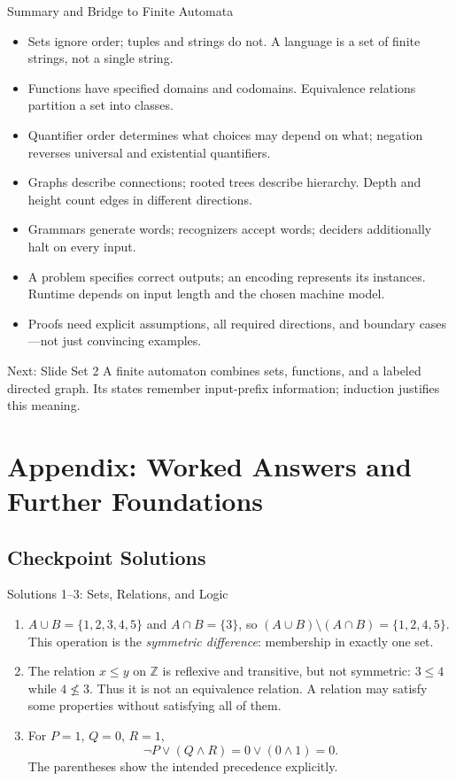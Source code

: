\documentclass[10pt]{beamer}
\begin{document}
\begin{frame}{Summary and Bridge to Finite Automata}
  \small
  \begin{itemize}
    \item Sets ignore order; tuples and strings do not. A language is a set
      of finite strings, not a single string.
    \item Functions have specified domains and codomains. Equivalence
      relations partition a set into classes.
    \item Quantifier order determines what choices may depend on what;
      negation reverses universal and existential quantifiers.
    \item Graphs describe connections; rooted trees describe hierarchy.
      Depth and height count edges in different directions.
    \item Grammars generate words; recognizers accept words; deciders
      additionally halt on every input.
    \item A problem specifies correct outputs; an encoding represents its
      instances. Runtime depends on input length and the chosen machine model.
    \item Proofs need explicit assumptions, all required directions, and
      boundary cases---not just convincing examples.
  \end{itemize}
  \pause
  \begin{block}{Next: Slide Set 2}
    A finite automaton combines sets, functions, and a labeled directed graph.
    Its states remember input-prefix information; induction justifies this meaning.
  \end{block}
\end{frame}

\appendix
\section{Appendix: Worked Answers and Further Foundations}
\subsection{Checkpoint Solutions}

\begin{frame}{Solutions 1--3: Sets, Relations, and Logic}
  \small
  \begin{enumerate}
    \item $A\cup B=\{1,2,3,4,5\}$ and $A\cap B=\{3\}$, so
      $(A\cup B)\setminus(A\cap B)=\{1,2,4,5\}$.
      This operation is the \emph{symmetric difference}: membership in
      exactly one set.
    \pause
    \item The relation $x\le y$ on $\mathbb{Z}$ is reflexive and transitive,
      but not symmetric: $3\le4$ while $4\not\le3$. Thus it is not an
      equivalence relation. A relation may satisfy some properties without
      satisfying all of them.
    \pause
    \item For $P=1$, $Q=0$, $R=1$,
      \[
        \neg P\vee(Q\wedge R)=0\vee(0\wedge1)=0.
      \]
      The parentheses show the intended precedence explicitly.
  \end{enumerate}
\end{frame}
\end{document}
